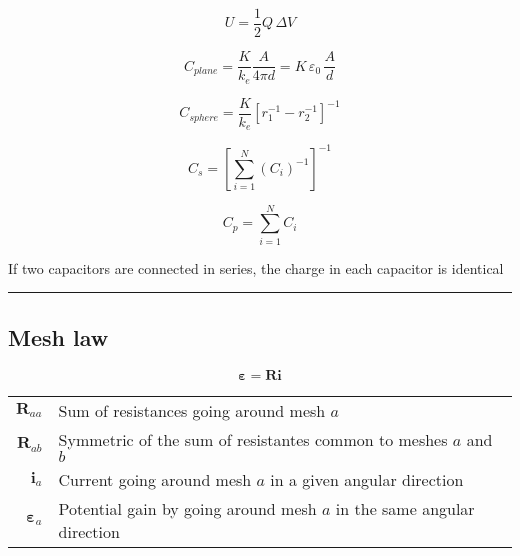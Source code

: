 \documentclass{form}
\newcommand{\matr}[1]{\mathbf{#1}} %
\begin{document}
\begin{minipage}[c]{0.10\textwidth}
	\begin{equation*}
		U=\frac{1}{2}Q\,\Delta V
	\end{equation*}
\end{minipage}
\begin{minipage}[c]{0.25\textwidth}
	\begin{equation*}
		C_{plane} = \frac{K}{k_e}\frac{A}{4\pi d} = K\,\varepsilon_0 \,\frac{A}{d}
	\end{equation*}
\end{minipage}
\begin{minipage}[c]{0.25\textwidth}
	\begin{equation*}
		C_{sphere} = \frac{K}{k_e}\left[r_1^{-1}-r_2^{-1}\right]^{-1}
	\end{equation*}
\end{minipage}
\begin{center}
	\begin{minipage}[c]{0.17\textwidth}
		\begin{equation*}
			C_s = \left[\sum_{i=1}^{N}{(C_i)^{-1}}\right]^{-1}
		\end{equation*}
	\end{minipage}
	\begin{minipage}[c]{0.11\textwidth}
		\begin{equation*}
			C_p = \sum_{i=1}^{N}{C_i}
		\end{equation*}
	\end{minipage}
	\begin{minipage}[c]{0.70\textwidth}
		If two capacitors are connected in series, the charge in each capacitor is identical
	\end{minipage}
\end{center}
\noindent\rule{\textwidth}{0.4pt}
\begin{minipage}[c]{0.15\textwidth}
	\subsection*{Mesh law}
\end{minipage}
\begin{minipage}[c]{0.15\textwidth}
	\begin{equation*}
		\matr{\varepsilon}=\matr{R}\matr{i}
	\end{equation*}
\end{minipage}
\begin{minipage}[c]{0.65\textwidth}
	\begin{tabular}{ r l }
		$\matr{R}_{aa}$ & Sum of resistances going around mesh $a$ \\
		$\matr{R}_{ab}$ & Symmetric of the sum of resistantes common to meshes $a$ and $b$\\
		$\matr{i}_a   $ & Current going around mesh $a$ in a given angular direction\\
		$\matr{\varepsilon}_a$ & Potential gain by going around mesh $a$ in the same angular direction
	\end{tabular}
\end{minipage}\\
\end{document}
